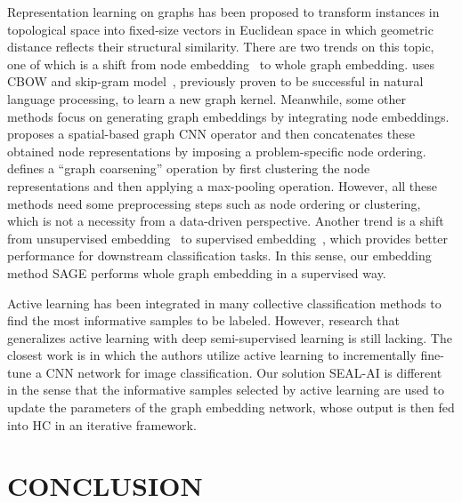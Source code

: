 \documentclass[sigconf]{acmart}
\begin{document}
Representation learning on graphs has been proposed to transform instances in topological space into fixed-size vectors in Euclidean space in which geometric distance reflects their structural similarity.  There are two trends on this topic, one of which is a shift from node embedding~\cite{perozzi2014deepwalk,grover2016node2vec} to whole graph embedding.  \cite{Yanardag:2015:DGK:2783258.2783417} uses CBOW and skip-gram model~\cite{mikolov2013distributed}, previously proven to be successful in natural language processing, to learn a new graph kernel.  Meanwhile, some other methods focus on generating graph embeddings by integrating node embeddings.  \cite{Niepert2016LearningCN} proposes a spatial-based graph CNN operator and then concatenates these obtained node representations by imposing a problem-specific node ordering.  \cite{defferrard2016convolutional} defines a ``graph coarsening'' operation by first clustering the node representations and then applying a max-pooling operation.  However, all these methods need some preprocessing steps such as node ordering or clustering, which is not a necessity from a data-driven perspective.   Another trend is a shift from unsupervised embedding~\cite{mikolov2013distributed} to supervised embedding~\cite{dai2016discriminative,DBLP:journals/corr/LinFSYXZB17}, which provides better performance for downstream classification tasks.  In this sense, our embedding method SAGE performs whole graph embedding in a supervised way.


Active learning has been integrated in many collective classification methods \cite{settles2012active,bilgic2010active} to find the most informative samples to be labeled.  However, research that generalizes active learning with deep semi-supervised learning is still lacking.  The closest work is \cite{zhou2017fine} in which the authors utilize active learning to incrementally fine-tune a CNN network for image classification.  Our solution SEAL-AI is different in the sense that the informative samples selected by active learning are used to update the parameters of the graph embedding network, whose output is then fed into HC in an iterative framework.


\section{CONCLUSION}\label{sec.con}
\end{document}
